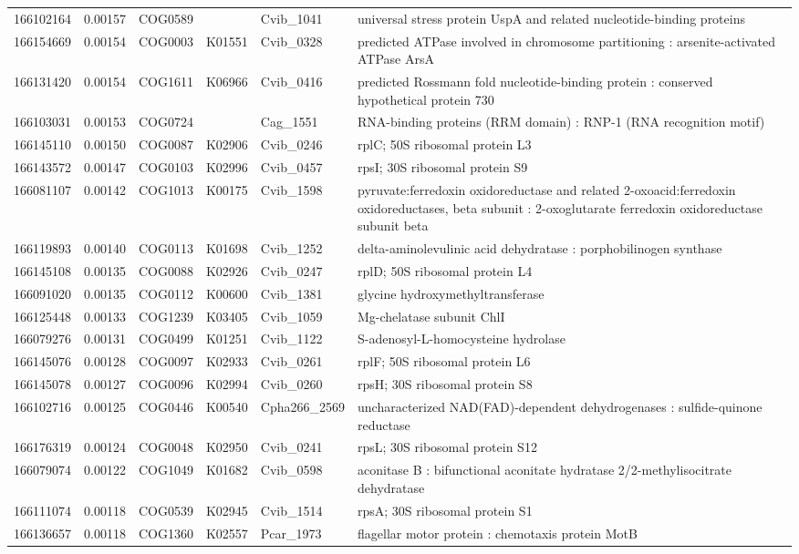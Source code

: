 \begin{landscape}
\begin{longtable}{p{1.6cm}p{1.2cm}p{1.5cm}p{1.5cm}p{2.8cm}p{13.5cm}}
166102164&0.00157&COG0589&&Cvib\_1041&universal stress protein UspA and related nucleotide-binding proteins \\
166154669&0.00154&COG0003&K01551&Cvib\_0328&predicted ATPase involved in chromosome partitioning : arsenite-activated ATPase ArsA \\
166131420&0.00154&COG1611&K06966&Cvib\_0416&predicted Rossmann fold nucleotide-binding protein : conserved hypothetical protein 730 \\
166103031&0.00153&COG0724&&Cag\_1551&RNA-binding proteins (RRM domain) : RNP-1 (RNA recognition motif) \\
166145110&0.00150&COG0087&K02906&Cvib\_0246&rplC; 50S ribosomal protein L3 \\
166143572&0.00147&COG0103&K02996&Cvib\_0457&rpsI; 30S ribosomal protein S9 \\
166081107&0.00142&COG1013&K00175&Cvib\_1598&pyruvate:ferredoxin oxidoreductase and related 2-oxoacid:ferredoxin oxidoreductases, beta subunit : 2-oxoglutarate ferredoxin oxidoreductase subunit beta \\
166119893&0.00140&COG0113&K01698&Cvib\_1252&delta-aminolevulinic acid dehydratase : porphobilinogen synthase \\
166145108&0.00135&COG0088&K02926&Cvib\_0247&rplD; 50S ribosomal protein L4 \\
166091020&0.00135&COG0112&K00600&Cvib\_1381&glycine hydroxymethyltransferase \\
166125448&0.00133&COG1239&K03405&Cvib\_1059&Mg-chelatase subunit ChlI \\
166079276&0.00131&COG0499&K01251&Cvib\_1122&S-adenosyl-L-homocysteine hydrolase \\
166145076&0.00128&COG0097&K02933&Cvib\_0261&rplF; 50S ribosomal protein L6 \\
166145078&0.00127&COG0096&K02994&Cvib\_0260&rpsH; 30S ribosomal protein S8 \\
166102716&0.00125&COG0446&K00540&Cpha266\_2569&uncharacterized NAD(FAD)-dependent dehydrogenases : sulfide-quinone reductase \\
166176319&0.00124&COG0048&K02950&Cvib\_0241&rpsL; 30S ribosomal protein S12 \\
166079074&0.00122&COG1049&K01682&Cvib\_0598&aconitase B : bifunctional aconitate hydratase 2/2-methylisocitrate dehydratase \\
166111074&0.00118&COG0539&K02945&Cvib\_1514&rpsA; 30S ribosomal protein S1 \\
166136657&0.00118&COG1360&K02557&Pcar\_1973&flagellar motor protein : chemotaxis protein MotB \\

\end{longtable}
\end{landscape}
